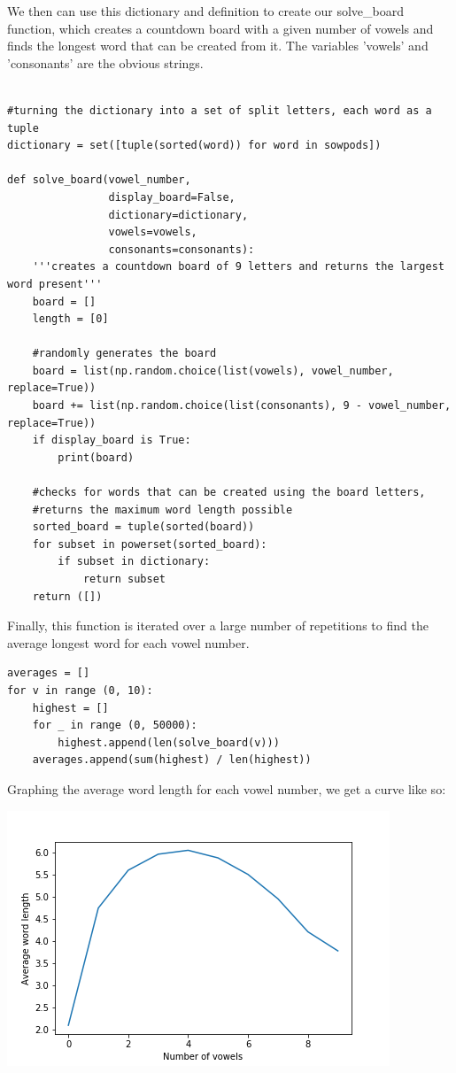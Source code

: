 \documentclass{article}
\begin{document}
We then can use this dictionary and definition to create our solve\_board function, which creates a countdown board with a given number of vowels and finds the longest word that can be created from it. The variables 'vowels' and 'consonants' are the obvious strings.
\begin{verbatim}

#turning the dictionary into a set of split letters, each word as a tuple
dictionary = set([tuple(sorted(word)) for word in sowpods])

def solve_board(vowel_number, 
                display_board=False,
                dictionary=dictionary,
                vowels=vowels,
                consonants=consonants):
    '''creates a countdown board of 9 letters and returns the largest word present'''
    board = []
    length = [0]

    #randomly generates the board
    board = list(np.random.choice(list(vowels), vowel_number, replace=True))
    board += list(np.random.choice(list(consonants), 9 - vowel_number, replace=True))
    if display_board is True:
        print(board)
            
    #checks for words that can be created using the board letters,
    #returns the maximum word length possible
    sorted_board = tuple(sorted(board))
    for subset in powerset(sorted_board):
        if subset in dictionary:
            return subset
    return ([])
\end{verbatim}

Finally, this function is iterated over a large number of repetitions to find the average longest word for each vowel number.
\begin{verbatim}
averages = []
for v in range (0, 10):
    highest = [] 
    for _ in range (0, 50000):
        highest.append(len(solve_board(v)))        
    averages.append(sum(highest) / len(highest))
\end{verbatim}

\newpage

Graphing the average word length for each vowel number, we get a curve like so:

\begin{center}
    \includegraphics[width=.4\textwidth]{english.png}
\end{center}
\end{document}
